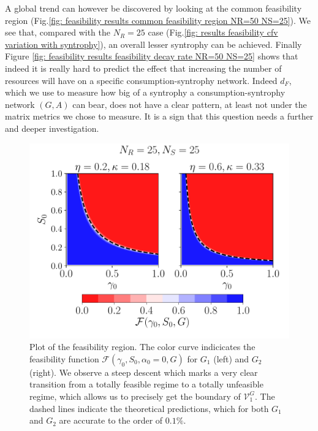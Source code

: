 \documentclass[12pt, titlepage]{report}
\begin{document}
A global trend can however be discovered by looking at the common feasibility region (Fig.\ref{fig: feasibility results common feasibility region NR=50 NS=25}). We see that, compared with the $N_R=25$ case (Fig.\ref{fig: results feasibility cfv variation with syntrophy}), an overall lesser syntrophy can be achieved. Finally Figure \ref{fig: feasibility results feasibility decay rate NR=50 NS=25} shows that indeed it is really hard to predict the effect that increasing the number of resources will have on a specific consumption-syntrophy network. Indeed $d_F$, which we use to measure how big of a syntrophy a consumption-syntrophy network $(G,A)$ can bear, does not have a clear pattern, at least not under the matrix metrics we chose to measure. It is a sign that this question needs a further and deeper investigation.
\begin{figure}[h!]
\centering
\includegraphics[width=0.7\linewidth]{typical_feasibility_volume}
\caption{Plot of the feasibility region. The color curve indicicates the feasibility function $\mathcal{F}(\gamma_0, S_0, \alpha_0=0, G)$ for $G_1$ (left) and $G_2$ (right). We observe a steep descent which marks a very clear transition from a totally feasible regime to a totally unfeasible regime, which allows us to precisely get the boundary of $\mathcal{V}^{G}_1$. The dashed lines indicate the theoretical predictions, which for both $G_1$ and $G_2$ are accurate to the order of $0.1 \%$.}
\label{fig: typical feasibility region}
\end{figure}
\end{document}
